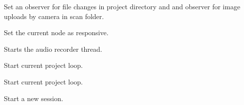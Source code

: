 \documentclass[letterpaper,10pt,english]{sphinxmanual}
\begin{document}
\begin{fulllineitems}
\begin{fulllineitems}
\end{fulllineitems}


\begin{fulllineitems}
\label{state:state.State.set_observer}
Set an observer for file changes in project directory and
and observer for image uploads by camera in scan folder.

\end{fulllineitems}


\begin{fulllineitems}
\label{state:state.State.set_responsive}
Set the current node as responsive.

\end{fulllineitems}


\begin{fulllineitems}
\label{state:state.State.start_audio_recorder}
Starts the audio recorder thread.

\end{fulllineitems}


\begin{fulllineitems}
\label{state:state.State.start_current_project_thread}
Start current project loop.

\end{fulllineitems}


\begin{fulllineitems}
\label{state:state.State.start_current_session_thread}
Start current project loop.

\end{fulllineitems}


\begin{fulllineitems}
\label{state:state.State.start_new_session}
Start a new session.


\end{fulllineitems}
\end{fulllineitems}
\end{document}
